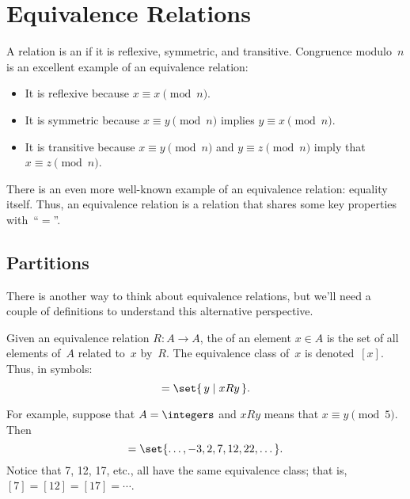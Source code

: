 \section{Equivalence Relations}

A relation is an  if it is reflexive,
symmetric, and transitive.  Congruence modulo~$n$ is an excellent
example of an equivalence relation:
\begin{itemize}

\item
It is reflexive because $x \equiv x \pmod{n}$.

\item
It is symmetric because $x \equiv y \pmod{n}$ implies $y \equiv x
\pmod{n}$.

\item
It is transitive because $x \equiv y \pmod{n}$ and $y \equiv z
\pmod{n}$ imply that $x \equiv z \pmod{n}$.

\end{itemize}
There is an even more well-known example of an equivalence relation:
equality itself.  Thus, an equivalence relation is a relation that
shares some key properties with~``$=$''.

\subsection{Partitions}

There is another way to think about equivalence relations, but we'll
need a couple of definitions to understand this alternative
perspective.

\begin{definition}\label{def:equiv_class}

Given an equivalence relation $R : A \to A$, the  of an element $x \in A$  is the set of all elements of~$A$
related to~$x$ by~$R$.  The equivalence class of~$x$ is
denoted~$[x]$.  Thus, in symbols:
\begin{equation*}
    [x] = \set{\, y \mid x R y \,}.
\end{equation*}
\end{definition}

For example, suppose that $A = \integers$ and $x R y$ means that $x
\equiv y \pmod{5}$.  Then
\begin{equation*}
    [7] = \set{ \dots, -3, 2, 7, 12, 22, \dots }.
\end{equation*}
Notice that 7, 12, 17, etc., all have the same equivalence class; that
is, $[7] = [12] = [17] = \cdots$.

